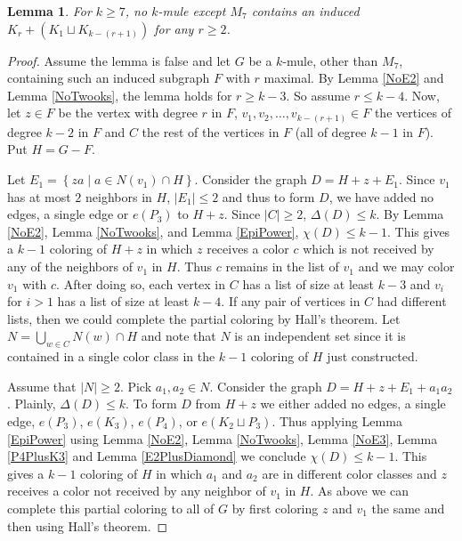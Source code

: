 \documentclass[12pt]{article}
\theoremstyle{plain}
\newtheorem{lem}[thm]{Lemma}
\theoremstyle{definition}
\theoremstyle{remark}
\newcommand{\setbs}[2]{\left\{ #1 \mid #2 \right\}}
\newcommand{\card}[1]{\left|#1\right|}
\begin{document}
\begin{lem}\label{NoForksThatArentKnives}
For $k \geq 7$, no $k$-mule except $M_7$ contains an induced $K_r + \left(K_1 \sqcup K_{k - (r + 1)}\right)$ for any $r \geq 2$.
\end{lem}
\begin{proof}
Assume the lemma is false and let $G$ be a $k$-mule, other than $M_7$, containing such an induced subgraph $F$ with $r$ maximal.  By Lemma \ref{NoE2} and Lemma \ref{NoTwooks}, the lemma holds for $r \geq k - 3$. So assume $r \leq k - 4$.
Now, let $z \in F$ be the vertex with degree $r$ in $F$, $v_1, v_2, \ldots, v_{k - (r + 1)} \in F$ the vertices of degree $k - 2$ in $F$ and $C$ the rest of the vertices in $F$ (all of degree $k-1$ in $F$). Put $H = G - F$.\newline

Let $E_1 = \setbs{za}{a \in N(v_1) \cap H}$.  Consider the graph $D = H + z + E_1$.  Since $v_1$ has at most $2$ neighbors in $H$, $\card{E_1} \leq 2$ and thus to form $D$, we have added no edges, a single edge or $e(P_3)$ to $H + z$.  Since $\card{C} \geq 2$, $\Delta(D) \leq k$.  By Lemma \ref{NoE2}, Lemma \ref{NoTwooks}, and Lemma \ref{EpiPower}, $\chi(D) \leq k - 1$.  This gives a $k-1$ coloring of $H + z$ in which $z$ receives a color $c$ which is not received by any of the neighbors of $v_1$ in $H$.  Thus $c$ remains in the list of $v_1$ and we may color $v_1$ with $c$.  After doing so, each vertex in $C$ has a list of size at least $k-3$ and $v_i$ for $i > 1$ has a list of size at least $k-4$.  If any pair of vertices in $C$ had different lists, then we could complete the partial coloring by Hall's theorem.
Let $N = \bigcup_{w \in C} N(w) \cap H$ and note that $N$ is an independent set since it is contained in a single color class in the $k-1$ coloring of $H$ just constructed.\newline

Assume that $\card{N} \geq 2$.  Pick $a_1, a_2 \in N$. Consider the graph $D = H + z + E_1 + a_1a_2$.  Plainly, $\Delta(D) \leq k$. To form $D$ from $H + z$ we either added no edges, a single edge, $e(P_3)$, $e(K_3)$, $e(P_4)$, or $e(K_2 \sqcup P_3)$.  Thus applying Lemma \ref{EpiPower} using Lemma \ref{NoE2}, Lemma \ref{NoTwooks}, Lemma \ref{NoE3}, Lemma \ref{P4PlusK3} and Lemma \ref{E2PlusDiamond} we conclude $\chi(D) \leq k - 1$.  This gives a $k-1$ coloring of $H$ in which $a_1$ and $a_2$ are in different color classes and $z$ receives a color not received by any neighbor of $v_1$ in $H$.  As above we can complete this partial coloring to all of $G$ by first coloring $z$ and $v_1$ the same and then using Hall's theorem.\newline


\end{proof}
\end{document}
